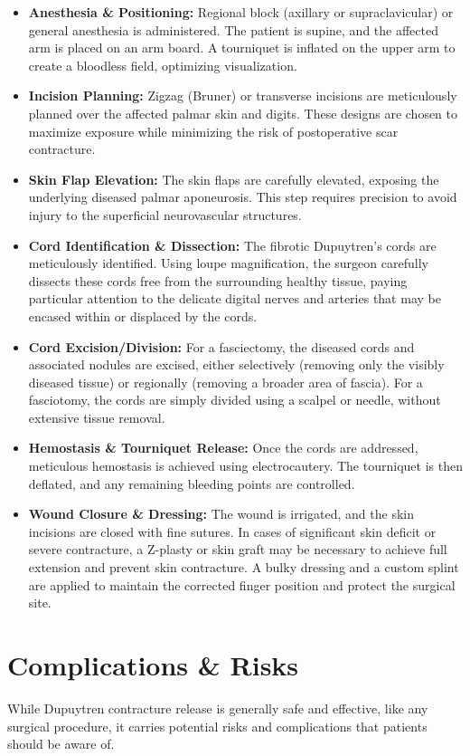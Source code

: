 \begin{itemize}
  \item \textbf{Anesthesia \& Positioning:} Regional block (axillary or supraclavicular) or general anesthesia is administered. The patient is supine, and the affected arm is placed on an arm board. A tourniquet is inflated on the upper arm to create a bloodless field, optimizing visualization.
  \item \textbf{Incision Planning:} Zigzag (Bruner) or transverse incisions are meticulously planned over the affected palmar skin and digits. These designs are chosen to maximize exposure while minimizing the risk of postoperative scar contracture.
  \item \textbf{Skin Flap Elevation:} The skin flaps are carefully elevated, exposing the underlying diseased palmar aponeurosis. This step requires precision to avoid injury to the superficial neurovascular structures.
  \item \textbf{Cord Identification \& Dissection:} The fibrotic Dupuytren's cords are meticulously identified. Using loupe magnification, the surgeon carefully dissects these cords free from the surrounding healthy tissue, paying particular attention to the delicate digital nerves and arteries that may be encased within or displaced by the cords.
  \item \textbf{Cord Excision/Division:} For a fasciectomy, the diseased cords and associated nodules are excised, either selectively (removing only the visibly diseased tissue) or regionally (removing a broader area of fascia). For a fasciotomy, the cords are simply divided using a scalpel or needle, without extensive tissue removal.
  \item \textbf{Hemostasis \& Tourniquet Release:} Once the cords are addressed, meticulous hemostasis is achieved using electrocautery. The tourniquet is then deflated, and any remaining bleeding points are controlled.
  \item \textbf{Wound Closure \& Dressing:} The wound is irrigated, and the skin incisions are closed with fine sutures. In cases of significant skin deficit or severe contracture, a Z-plasty or skin graft may be necessary to achieve full extension and prevent skin contracture. A bulky dressing and a custom splint are applied to maintain the corrected finger position and protect the surgical site.
\end{itemize}

\section*{Complications \& Risks}
While Dupuytren contracture release is generally safe and effective, like any surgical procedure, it carries potential risks and complications that patients should be aware of.


